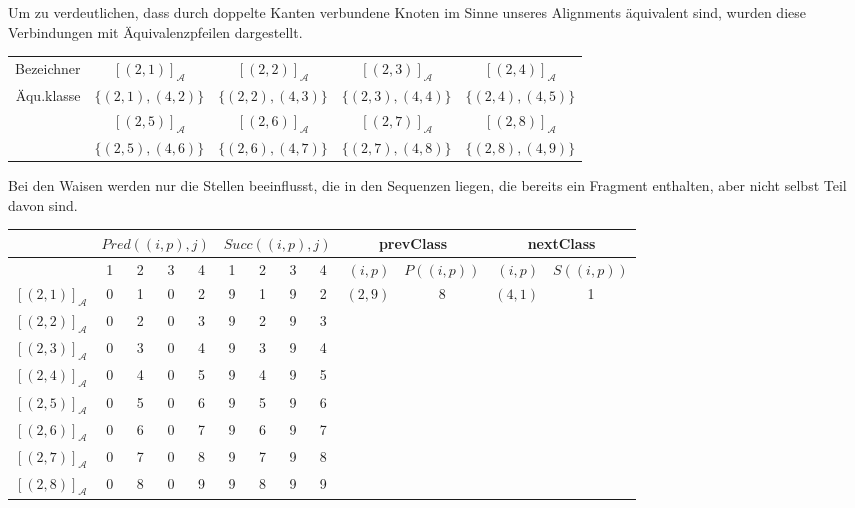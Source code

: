 Um zu verdeutlichen, dass durch doppelte Kanten verbundene Knoten im Sinne unseres Alignments äquivalent sind, wurden diese Verbindungen mit Äquivalenzpfeilen dargestellt.

\small
\begin{tabular}{r||c|c|c|c}
	Bezeichner 	& $[(2,1)]_{\mathcal{A}}$ & $[(2,2)]_{\mathcal{A}}$ & $[(2,3)]_{\mathcal{A}}$ & $[(2,4)]_{\mathcal{A}}$\\
	Äqu.klasse  & $\{(2,1),(4,2)\}$	      & $\{(2,2),(4,3)\}$       & $\{(2,3),(4,4)\}$       & $\{(2,4),(4,5)\}$        \\
	\hline
	            & $[(2,5)]_{\mathcal{A}}$ & $[(2,6)]_{\mathcal{A}}$ & $[(2,7)]_{\mathcal{A}}$ & $[(2,8)]_{\mathcal{A}}$\\
	            & $\{(2,5),(4,6)\}$       & $\{(2,6),(4,7)\}$       & $\{(2,7),(4,8)\}$       & $\{(2,8),(4,9)\}$  
\end{tabular}
\normalsize

Bei den Waisen werden nur die Stellen beeinflusst, die in den Sequenzen liegen, die bereits ein Fragment enthalten, aber nicht selbst Teil davon sind.

\vspace{5pt}

\small
\begin{tabular}{r|cccc|cccc||r|c|r|c}
	 & \multicolumn{4}{c|}{$Pred((i,p),j)$} & \multicolumn{4}{c||}{$Succ((i,p),j)$} & \multicolumn{2}{c|}{\textrm{prevClass}} & \multicolumn{2}{c}{\textrm{nextClass}} \\ \hline
	\diagbox[dir=NW]{$(i,p)$}{$j$} & 1 & 2 & 3 & 4 & 1 & 2 & 3 & 4 & $(i,p)$ & $P((i,p))$ & $(i,p)$ & $S((i,p))$ \\ \hline
	$[(2,1)]_{\mathcal{A}}$ & 0 & 1 & 0 & 2 & 9 & 1 & 9 & 2 & $(2,9)$ & 8 & $(4,1)$ & 1 \\
	$[(2,2)]_{\mathcal{A}}$ & 0 & 2 & 0 & 3 & 9 & 2 & 9 & 3 & & & & \\
	$[(2,3)]_{\mathcal{A}}$ & 0 & 3 & 0 & 4 & 9 & 3 & 9 & 4 & & & & \\
	$[(2,4)]_{\mathcal{A}}$ & 0 & 4 & 0 & 5 & 9 & 4 & 9 & 5 & & & & \\
	$[(2,5)]_{\mathcal{A}}$ & 0 & 5 & 0 & 6 & 9 & 5 & 9 & 6 & & & & \\
	$[(2,6)]_{\mathcal{A}}$ & 0 & 6 & 0 & 7 & 9 & 6 & 9 & 7 & & & & \\
	$[(2,7)]_{\mathcal{A}}$ & 0 & 7 & 0 & 8 & 9 & 7 & 9 & 8 & & & & \\
	$[(2,8)]_{\mathcal{A}}$ & 0 & 8 & 0 & 9 & 9 & 8 & 9 & 9 & & & & 
\end{tabular}
\normalsize
\vspace{5pt}

